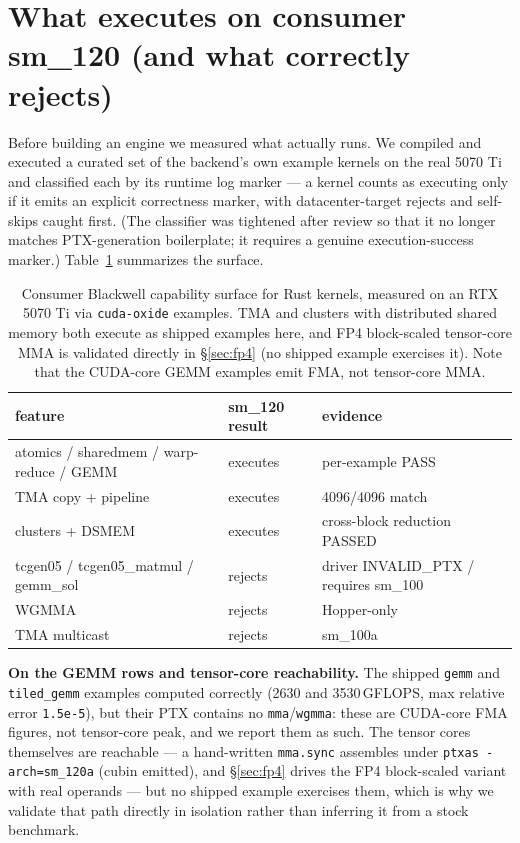 \documentclass[11pt]{article}
\begin{document}
\section{What executes on consumer sm\_120 (and what correctly rejects)}
\label{sec:cap}
Before building an engine we measured what actually runs. We compiled and executed a curated set of the backend's own example kernels on the real 5070 Ti and classified each by its runtime log marker --- a kernel counts as executing only if it emits an explicit correctness marker, with datacenter-target rejects and self-skips caught first. (The classifier was tightened after review so that it no longer matches PTX-generation boilerplate; it requires a genuine execution-success marker.) Table~\ref{tab:cap} summarizes the surface.

\begin{table}[t]\centering
\begin{tabular}{lll}
\toprule
feature & sm\_120 result & evidence\\
\midrule
atomics / sharedmem / warp-reduce / GEMM & executes & per-example PASS\\
TMA copy + pipeline & executes & 4096/4096 match\\
clusters + DSMEM & executes & cross-block reduction PASSED\\
tcgen05 / tcgen05\_matmul / gemm\_sol & rejects & driver INVALID\_PTX / requires sm\_100\\
WGMMA & rejects & Hopper-only\\
TMA multicast & rejects & sm\_100a\\
\bottomrule
\end{tabular}
\caption{Consumer Blackwell capability surface for Rust kernels, measured on an RTX 5070 Ti via \texttt{cuda-oxide} examples. TMA and clusters with distributed shared memory both execute as shipped examples here, and FP4 block-scaled tensor-core MMA is validated directly in \S\ref{sec:fp4} (no shipped example exercises it). Note that the CUDA-core GEMM examples emit FMA, not tensor-core MMA.}
\label{tab:cap}
\end{table}

\textbf{On the GEMM rows and tensor-core reachability.} The shipped \texttt{gemm} and \texttt{tiled\_gemm} examples computed correctly (2630 and 3530\,GFLOPS, max relative error \texttt{1.5e-5}), but their PTX contains no \texttt{mma}/\texttt{wgmma}: these are CUDA-core FMA figures, not tensor-core peak, and we report them as such. The tensor cores themselves are reachable --- a hand-written \texttt{mma.sync} assembles under \texttt{ptxas -arch=sm\_120a} (cubin emitted), and \S\ref{sec:fp4} drives the FP4 block-scaled variant with real operands --- but no shipped example exercises them, which is why we validate that path directly in isolation rather than inferring it from a stock benchmark.
\end{document}
